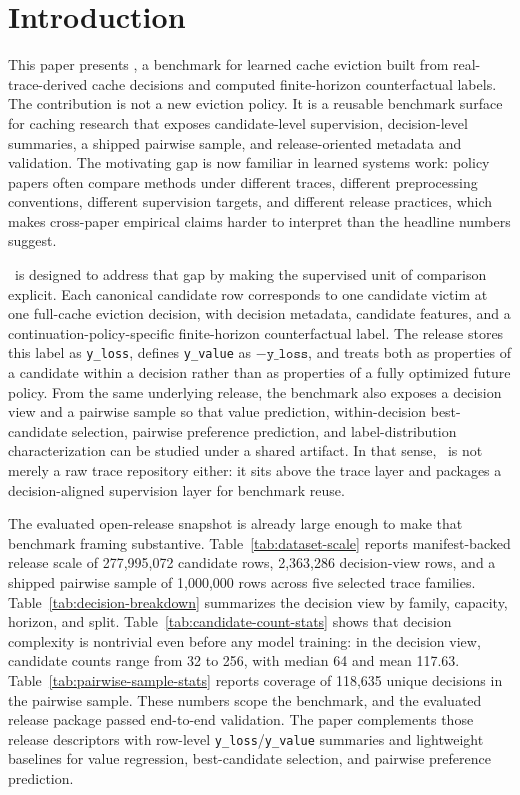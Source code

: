 \section{Introduction}

\begin{sloppypar}
This paper presents \lafc, a benchmark for learned cache eviction built from real-trace-derived cache decisions and computed finite-horizon counterfactual labels. The contribution is not a new eviction policy. It is a reusable benchmark surface for caching research that exposes candidate-level supervision, decision-level summaries, a shipped pairwise sample, and release-oriented metadata and validation. The motivating gap is now familiar in learned systems work: policy papers often compare methods under different traces, different preprocessing conventions, different supervision targets, and different release practices, which makes cross-paper empirical claims harder to interpret than the headline numbers suggest.

\lafc\ is designed to address that gap by making the supervised unit of comparison explicit. Each canonical candidate row corresponds to one candidate victim at one full-cache eviction decision, with decision metadata, candidate features, and a continuation-policy-specific finite-horizon counterfactual label. The release stores this label as \texttt{y\_loss}, defines \texttt{y\_value} as $-\texttt{y\_loss}$, and treats both as properties of a candidate within a decision rather than as properties of a fully optimized future policy. From the same underlying release, the benchmark also exposes a decision view and a pairwise sample so that value prediction, within-decision best-candidate selection, pairwise preference prediction, and label-distribution characterization can be studied under a shared artifact. In that sense, \lafc\ is not merely a raw trace repository either: it sits above the trace layer and packages a decision-aligned supervision layer for benchmark reuse.

The evaluated open-release snapshot is already large enough to make that benchmark framing substantive. Table~\ref{tab:dataset-scale} reports manifest-backed release scale of 277,995,072 candidate rows, 2,363,286 decision-view rows, and a shipped pairwise sample of 1,000,000 rows across five selected trace families. Table~\ref{tab:decision-breakdown} summarizes the decision view by family, capacity, horizon, and split. Table~\ref{tab:candidate-count-stats} shows that decision complexity is nontrivial even before any model training: in the decision view, candidate counts range from 32 to 256, with median 64 and mean 117.63. Table~\ref{tab:pairwise-sample-stats} reports coverage of 118,635 unique decisions in the pairwise sample. These numbers scope the benchmark, and the evaluated release package passed end-to-end validation. The paper complements those release descriptors with row-level \texttt{y\_loss}/\texttt{y\_value} summaries and lightweight baselines for value regression, best-candidate selection, and pairwise preference prediction.
\end{sloppypar}

